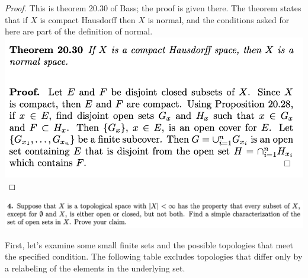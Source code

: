 \begin{proof}
  This is theorem 20.30 of Bass; the proof is given there. The theorem states that if $X$ is compact Hausdorff
  then $X$ is normal, and the conditions asked for here are part of the definition of normal.\\
  \includegraphics[width=400pt]{img/analysis--berkeley-202a-hw13-7531.png}
\end{proof}


\newpage
\begin{mdframed}
\includegraphics[width=400pt]{img/analysis--berkeley-202a-hw13-9356.png}
\end{mdframed}

First, let's examine some small finite sets and the possible topologies that meet the specified condition. The
following table excludes topologies that differ only by a relabeling of the elements in the underlying set.


